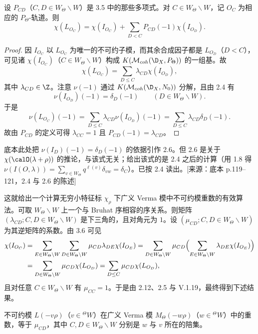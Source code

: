 \begin{theorem}\label{thm:06.3.6}
设 $P_{CD}$（$C,D\in W_\Theta\backslash W$）是 3.5 中的那些多项式。对 $C\in W_\Theta\backslash W$，记 $O_C$ 为相应的 $P_\Theta$-轨道。则
$$\chi(L_{O_C})=\chi(I_{O_C})+\sum_{D<C}P_{CD}(-1)\chi(I_{O_D}).$$
\end{theorem}

\begin{proof}
因 $I_{O_C}$ 以 $L_{O_C}$ 为唯一的不可约子模，而其余合成因子都是 $L_{O_D}$（$D<C$），可见诸 $\chi(I_{O_C})$（$C\in W_\Theta\backslash W$）构成 $K(\mathcal{M}_{coh}(\D_X,P_\Theta))$ 的一组基。故
$$\chi(L_{O_C})=\sum_{D\le C}\lambda_{CD}\chi(I_{O_D}),$$
其中 $\lambda_{CD}\in\Z$。注意 $\nu(-1)$ 通过 $K(\mathcal{M}_{coh}(\D_X,N_0))$ 分解，且由 2.4 有
$$\nu(I_{O_D})(-1)=\delta_D(-1)\qquad(D\in W_\Theta\backslash W).$$
于是
$$\nu(L_{O_C})(-1)=\sum_{D\le C}\lambda_{CD}\nu(I_{O_D})(-1)=\sum_{D\le C}\lambda_{CD}\delta_D(-1).$$
故由 $P_{CD}$ 的定义可得 $\lambda_{CC}=1$ 且 $P_{CD}(-1)=\lambda_{CD}$。
\end{proof}

\begin{annote}
底本此处把 $\nu(I_D)(-1)=\delta_D(-1)$ 的依据引作 2.6。但 2.6 是关于 $\chi(\calO(\lambda+\rho))$ 的推论，与该式无关；给出该式的是 2.4 之后的计算（用 1.8 得 $\nu(I(O,\lambda))=\sum_{v\in W_\Theta}q^{\ell(v)}\delta_{vw}=\delta_C$）。已按 2.4 读出。[来源：底本 p.119--121，2.4 与 2.6 的陈述]
\end{annote}

这就给出一个计算无穷小特征标 $\chi_\rho$ 下广义 Verma 模中不可约模重数的有效算法。可取 $W_\Theta\backslash W$ 上一个与 Bruhat 序相容的序关系。则矩阵 $(\lambda_{CD};C,D\in W_\Theta\backslash W)$ 是下三角的，且对角元为 $1$。设 $(\mu_{CD};C,D\in W_\Theta\backslash W)$ 为其逆矩阵的系数。由 3.6 可见
{\small
\begin{align*}
\chi(I_{O_C})&=\sum_{E\in W_\Theta\backslash W}\sum_{D\in W_\Theta\backslash W}\mu_{CD}\lambda_{DE}\chi(I_{O_E})
=\sum_{D\in W_\Theta\backslash W}\mu_{CD}\Bigl(\sum_{E\in W_\Theta\backslash W}\lambda_{DE}\chi(I_{O_E})\Bigr)\\
&=\sum_{D\in W_\Theta\backslash W}\mu_{CD}\chi(L_{O_D})
=\sum_{D\le C}\mu_{CD}\chi(L_{O_D}),
\end{align*}
}
且对任意 $C\in W_\Theta\backslash W$ 有 $\mu_{CC}=1$。于是由 2.12、2.5 与 V.1.19，最终得到下述结果。

\begin{corollary}\label{cor:06.3.7}
不可约模 $L(-v\rho)$（$v\in{}^{\Theta}W$）在广义 Verma 模 $M_\Theta(-w\rho)$（$w\in{}^{\Theta}W$）中的重数，等于 $\mu_{CD}$，其中 $C,D\in W_\Theta\backslash W$ 分别是 $w$ 与 $v$ 所在的陪集。
\end{corollary}
